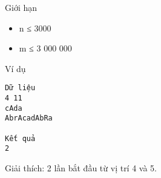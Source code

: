 Giới hạn  
\begin{itemize}
	\item     n ≤ 3000   
	\item     m ≤ 3 000 000   
\end{itemize}
   Ví dụ  
\begin{verbatim}
Dữ liệu
4 11
cAda
AbrAcadAbRa

Kết quả
2
\end{verbatim}

       Giải thích:      2 lần bắt đầu từ vị trí 4 và 5.
